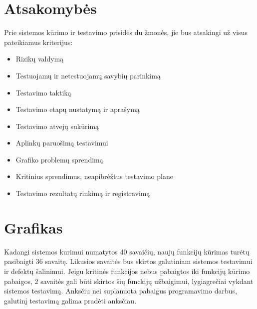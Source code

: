 \documentclass{VUMIFPSkursinis}
\begin{document}
    \section{Atsakomybės}

    Prie sistemos kūrimo ir testavimo prisidės du žmonės, jie bus atsakingi už visus pateikiamus kriterijus: 

    \begin{itemize}
    	\item Rizikų valdymą
    	\item Testuojamų ir netestuojamų savybių parinkimą
    	\item Testavimo taktiką
    	\item Testavimo etapų nustatymą ir aprašymą
    	\item Testavimo atvejų sukūrimą
    	\item Aplinkų paruošimą testavimui
      	\item Grafiko problemų sprendimą
    	\item Kritinius sprendimus, neapibrėžtus testavimo plane
    	\item Testavimo rezultatų rinkimą ir registravimą
    \end{itemize}

    \section{Grafikas}

    Kadangi sistemos kurimui numatytos 40 savaičių, naujų funkcijų kūrimas turėtų pasibaigti 36 savaitę.
    Likusios savaitės bus skirtos galutiniam sistemos testavimui ir defektų šalinimui. 
    Jeigu kritinės funkcijos nebus pabaigtos iki funkcijų kūrimo pabaigos, 2 savaitės gali būti skirtos šių funckijų užbaigimui,
     lygiagrečiai vykdant sistemos testavimą.
    Anksčiu nei suplanuota pabaigus programavimo darbus, galutinį testavimą galima pradėti anksčiau.
    
\end{document}
